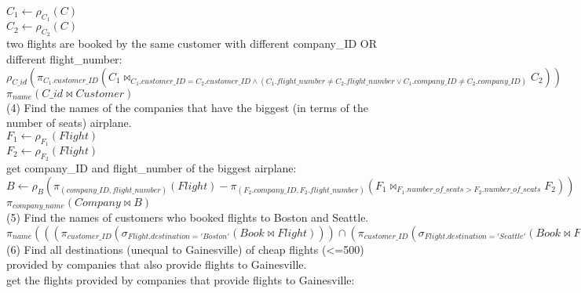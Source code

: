 \documentclass[]{article}
\begin{document}
	$C_{1}\leftarrow \rho_{C_{1}}(C)$\\
	
	$C_{2}\leftarrow \rho_{C_{2}}(C)$\\
	
	two flights are booked by the same customer with different company\_ID OR different flight\_number:\\
	
	$\rho_{C\_id}(\pi_{C_{1}.customer\_ID}(C_{1}\bowtie_{C_{1}.customer\_ID=C_{2}.customer\_ID\wedge(C_{1}.flight\_number\neq C_{2}.flight\_number\vee C_{1}.company\_ID\neq C_{2}.company\_ID)} C_{2}))$\\
	
	$\pi_{name}(C\_id\bowtie Customer)$\\
	
	\noindent(4) Find the names of the companies that have the biggest (in terms of the number of 
	seats) airplane.\\
	
	$F_{1}\leftarrow \rho_{F_{1}}(Flight)$\\
	
	$F_{2}\leftarrow \rho_{F_{2}}(Flight)$\\
	
	get company\_ID and flight\_number of the biggest airplane:\\ 
	
	$B\leftarrow \rho_{B}(\pi_{(company\_ID,flight\_number)}(Flight)-\pi_{(F_{2}.company\_ID,F_{2}.flight\_number)}(F_{1}\bowtie_{F_{1}.number\_of\_seats>F_{2}.number\_of\_seats}F_{2}))$\\
	
	$\pi_{company\_name}(Company\bowtie B)$\\
	
	\noindent(5) Find the names of customers who booked flights to Boston and Seattle.\\
	
	$\pi_{name}(((\pi_{customer\_ID}(\sigma_{Flight.destination='Boston'}(Book\bowtie Flight)))\cap(\pi_{customer\_ID}(\sigma_{Flight.destination='Seattle'}(Book\bowtie Flight))))\bowtie Customer)$\\
	
	\noindent(6) Find all destinations (unequal to Gainesville) of cheap flights (<=500) provided 
	by companies that also provide flights to Gainesville.\\
	
	get the flights provided by companies that provide flights to Gainesville:\\
	
\end{document}
